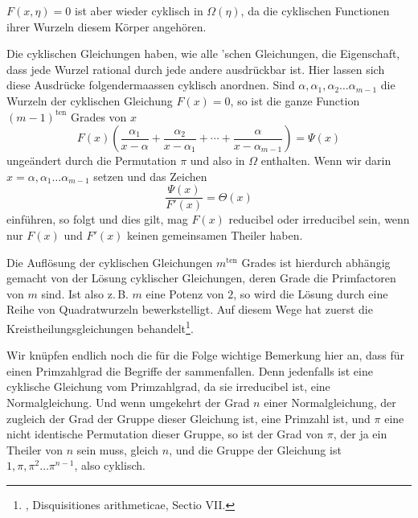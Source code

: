 
$F(x, \eta) = 0$ ist aber wieder cyklisch in $\Omega(\eta)$, da die cyklischen Functionen ihrer Wurzeln diesem Körper angehören.

Die cyklischen Gleichungen haben, wie alle 'schen Gleichungen, die Eigenschaft, dass jede Wurzel rational durch jede andere ausdrückbar ist. Hier lassen sich diese Ausdrücke folgendermaassen cyklisch anordnen. Sind $\alpha, \alpha_1, \alpha_2 \ldots \alpha_{m-1}$ die Wurzeln der cyklischen Gleichung $F(x) = 0$, so ist die ganze Function $(m-1)^{\text{ten}}$ Grades von $x$
\[
F(x)\left(\frac{\alpha_1}{x-\alpha} + \frac{\alpha_2}{x-\alpha_1} + \cdots + \frac{\alpha}{x-\alpha_{m-1}}\right) = \Psi(x)
\]
ungeändert durch die Permutation $\pi$ und also in $\Omega$ enthalten. Wenn wir darin $x = \alpha, \alpha_1 \ldots \alpha_{m-1}$ setzen und das Zeichen
\[
\frac{\Psi(x)}{F'(x)} = \Theta(x)
\]
einführen, so folgt
und dies gilt, mag $F(x)$ reducibel oder irreducibel sein, wenn nur $F(x)$ und $F'(x)$ keinen gemeinsamen Theiler haben.

Die Auflösung der cyklischen Gleichungen $m^{\text{ten}}$ Grades ist hierdurch abhängig gemacht von der Lösung cyklischer Gleichungen, deren Grade die Primfactoren von $m$ sind. Ist also z.\,B. $m$ eine Potenz von $2$, so wird die Lösung durch eine Reihe von Quadratwurzeln bewerkstelligt. Auf diesem Wege hat  zuerst die Kreistheilungsgleichungen behandelt\footnote{, Disquisitiones arithmeticae, Sectio VII.}.

Wir knüpfen endlich noch die für die Folge wichtige Bemerkung hier an, dass für einen Primzahlgrad die Begriffe der sammenfallen. Denn jedenfalls ist eine cyklische Gleichung vom Primzahlgrad, da sie irreducibel ist, eine Normalgleichung. Und wenn umgekehrt der Grad $n$ einer Normalgleichung, der zugleich der Grad der Gruppe dieser Gleichung ist, eine Primzahl ist, und $\pi$ eine nicht identische Permutation dieser Gruppe, so ist der Grad von $\pi$, der ja ein Theiler von $n$ sein muss, gleich $n$, und die Gruppe der Gleichung ist $1, \pi, \pi^2 \ldots \pi^{n-1}$, also cyklisch.
